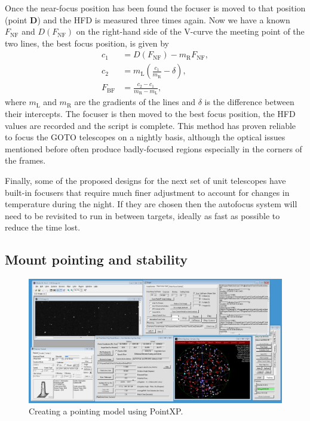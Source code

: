 \begin{colsection}
\begin{colsection}
Once the near-focus position has been found the focuser is moved to that position (point \textbf{D}) and the HFD is measured three times again. Now we have a known $F_\text{NF}$ and $D(F_\text{NF})$ on the right-hand side of the V-curve the meeting point of the two lines, the best focus position, is given by
%
\begin{equation}
    \begin{split}
                c_1 & = D(F_\text{NF}) - m_\text{R} F_\text{NF}, \\
                c_2 & = m_\text{L}(\frac{c_1}{m_\text{R}} - \delta), \\
        F_\text{BF} & = \frac{c_2 - c_1}{m_\text{R} - m_\text{L}},
    \end{split}
    \label{eq:bestfocus}
\end{equation}
%
where $m_\text{L}$ and $m_\text{R}$ are the gradients of the lines and $\delta$ is the difference between their intercepts. The focuser is then moved to the best focus position, the HFD values are recorded and the script is complete. This method has proven reliable to focus the GOTO telescopes on a nightly basis, although the optical issues mentioned before often produce badly-focused regions especially in the corners of the frames.

Finally, some of the proposed designs for the next set of unit telescopes have built-in focusers that require much finer adjustment to account for changes in temperature during the night. If they are chosen then the autofocus system will need to be revisited to run in between targets, ideally as fast as possible to reduce the time lost.

\end{colsection}

\newpage
\subsection{Mount pointing and stability}
\label{sec:pointxp}
\begin{colsection}

\begin{figure}[t]
    \begin{center}
        \includegraphics[width=\textwidth]{images/pointing_model.png}
    \end{center}
    \caption[Creating a pointing model using PointXP]{
        Creating a pointing model using PointXP.\@
    }\label{fig:pointing_model}
\end{figure}


\end{colsection}
\end{colsection}
